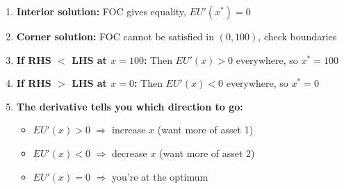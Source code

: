 \documentclass[12pt]{article}
\begin{document}
\begin{enumerate}[leftmargin=2cm, itemsep=1em]
    \item \textbf{Interior solution:} FOC gives equality, $EU'(x^*) = 0$

    \item \textbf{Corner solution:} FOC cannot be satisfied in $(0, 100)$, check boundaries

    \item \textbf{If RHS $<$ LHS at $x = 100$:} Then $EU'(x) > 0$ everywhere, so $x^* = 100$

    \item \textbf{If RHS $>$ LHS at $x = 0$:} Then $EU'(x) < 0$ everywhere, so $x^* = 0$

    \item \textbf{The derivative tells you which direction to go:}
    \begin{itemize}
        \item $EU'(x) > 0$ $\Rightarrow$ increase $x$ (want more of asset 1)
        \item $EU'(x) < 0$ $\Rightarrow$ decrease $x$ (want more of asset 2)
        \item $EU'(x) = 0$ $\Rightarrow$ you're at the optimum
    \end{itemize}
\end{enumerate}
\end{document}
